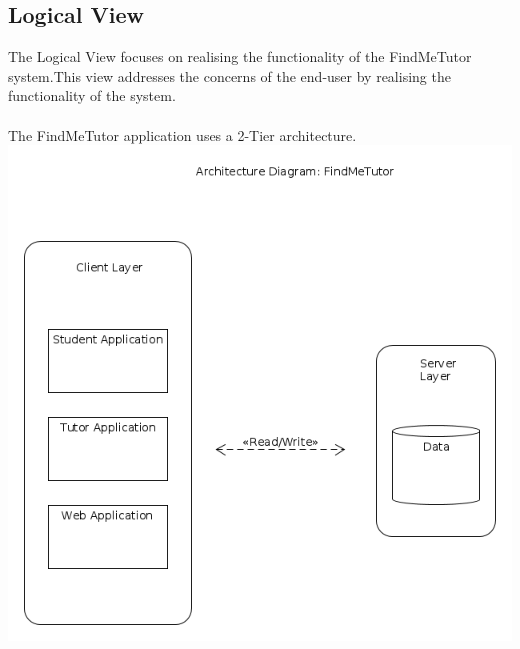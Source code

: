 \documentclass[12pt]{article}
\begin{document}
\pagebreak
\subsection{Logical View}
The Logical View focuses on realising the functionality of the FindMeTutor system.This view addresses the concerns of the end-user by realising the functionality of the system.\\\\
The FindMeTutor application uses a 2-Tier architecture.\\
\includegraphics[width=140mm]{./architecture_diagram.png}
\end{document}
